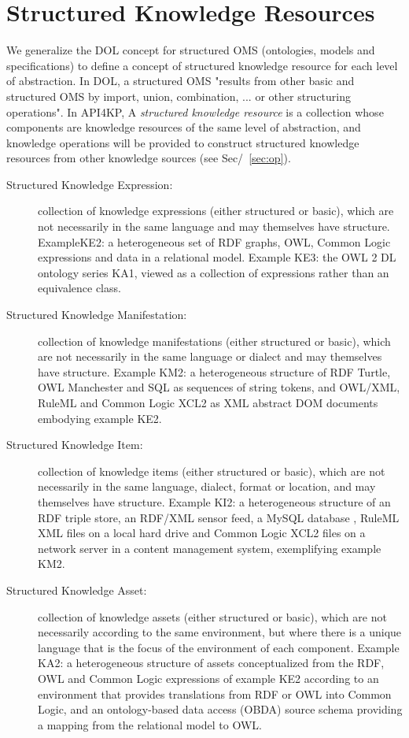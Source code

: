 \documentclass[runningheads]{llncs}
\begin{document}
\section{Structured Knowledge Resources}
\label{sec:structure}
We generalize the DOL  concept for structured OMS (ontologies, models and specifications) to define a concept of structured knowledge resource for each level of abstraction. In DOL, a structured OMS "results from other basic and structured OMS by import, union, combination, ... or other structuring operations".
In API4KP, A \emph{structured knowledge resource} is a collection whose components are knowledge resources of the same level of abstraction, and knowledge operations will be provided to construct structured knowledge resources from other knowledge sources (see Sec/~\ref{sec:op}).
\begin{description}
\item[Structured Knowledge Expression:] collection of knowledge expressions (either structured or basic), which are not necessarily in the same language and may themselves have structure. ExampleKE2: a heterogeneous set of RDF graphs, OWL, Common Logic expressions and data in a relational model. Example KE3: the OWL 2 DL ontology series KA1, viewed as a collection of expressions rather than an equivalence class.
\item[Structured Knowledge Manifestation:] collection of knowledge manifestations (either structured or basic), which are not necessarily in the same language or dialect and may themselves have structure. Example KM2: a heterogeneous structure of RDF Turtle, OWL Manchester and SQL as sequences of string tokens, and OWL/XML, RuleML and Common Logic XCL2 as XML abstract DOM documents embodying example KE2.
\item[Structured Knowledge Item:] collection of knowledge items  (either structured or basic), which are not necessarily in the same language, dialect, format or location, and may themselves have structure. Example KI2:  a heterogeneous structure of an RDF triple store, an RDF/XML sensor feed, a MySQL database , RuleML XML files on a local hard drive and Common Logic XCL2 files on a network server in a content management system, exemplifying example KM2.
\item[Structured Knowledge Asset:] collection of knowledge assets  (either structured or basic), which are not necessarily according to the same environment, but where there is a unique language that is the focus of the environment of each component. Example KA2: a heterogeneous structure of assets conceptualized from the RDF, OWL and Common Logic expressions of example KE2 according to an environment that provides translations from RDF or OWL into Common Logic, and an ontology-based data access (OBDA) source schema providing a mapping from the relational model to OWL.
\end{description}
\end{document}
